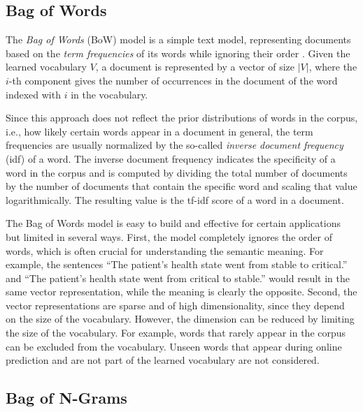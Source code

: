 \subsection{Bag of Words}\label{sec:bow}

The \textit{Bag of Words} (BoW) model is a simple text model, representing documents based on the \textit{term frequencies} of its words while ignoring their order \cite{harris1954distributional}.
Given the learned vocabulary $V$, a document is represented by a vector of size $|V|$, where the $i$-th component gives the number of occurrences in the document of the word indexed with $i$ in the vocabulary.

Since this approach does not reflect the prior distributions of words in the corpus, i.e., how likely certain words appear in a document in general, the term frequencies are usually normalized by the so-called \textit{inverse document frequency} (idf) of a word.
The inverse document frequency indicates the specificity of a word in the corpus and is computed by dividing the total number of documents by the number of documents that contain the specific word and scaling that value logarithmically.
The resulting value is the tf-idf score of a word in a document.

The Bag of Words model is easy to build and effective for certain applications but limited in several ways.
First, the model completely ignores the order of words, which is often crucial for understanding the semantic meaning.
For example, the sentences  \enquote{The patient’s health state went from stable to critical.} and  \enquote{The patient’s health state went from critical to stable.} would result in the same vector representation, while the meaning is clearly the opposite.
Second, the vector representations are sparse and of high dimensionality, since they depend on the size of the vocabulary.
However, the dimension can be reduced by limiting the size of the vocabulary.
For example, words that rarely appear in the corpus can be excluded from the vocabulary.
Unseen words that appear during online prediction and are not part of the learned vocabulary are not considered.

\subsection{Bag of N-Grams}

